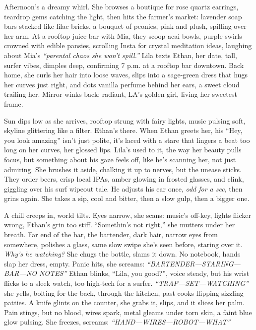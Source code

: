 \documentclass[12pt]{article}
\begin{document}
Afternoon’s a dreamy whirl. She browses a boutique for rose quartz earrings, teardrop gems catching the light, then hits the farmer’s market: lavender soap bars stacked like lilac bricks, a bouquet of peonies, pink and plush, spilling over her arm. At a rooftop juice bar with \textnormal{Mia}, they scoop acai bowls, purple swirls crowned with edible pansies, scrolling Insta for crystal meditation ideas, laughing about \textnormal{Mia}’s \textit{“parental chaos she won’t spill.”} \textnormal{Lila} texts \textnormal{Ethan}, her date, tall, surfer vibes, dimples deep, confirming 7 p.m. at a rooftop bar downtown. Back home, she curls her hair into loose waves, slips into a sage-green dress that hugs her curves just right, and dots vanilla perfume behind her ears, a sweet cloud trailing her. Mirror winks back: radiant, LA’s golden girl, living her sweetest frame.

Sun dips low as she arrives, rooftop strung with fairy lights, music pulsing soft, skyline glittering like a filter. \textnormal{Ethan}’s there. When \textnormal{Ethan} greets her, his “Hey, you look amazing” isn’t just polite, it’s laced with a stare that lingers a beat too long on her curves, her glossed lips. \textnormal{Lila}’s used to it, the way her beauty pulls focus, but something about his gaze feels off, like he’s scanning her, not just admiring. She brushes it aside, chalking it up to nerves, but the unease sticks. They order beers, crisp local IPAs, amber glowing in frosted glasses, and clink, giggling over his surf wipeout tale. He adjusts his ear once, \textit{odd for a sec}, then grins again. She takes a sip, cool and bitter, then a slow gulp, then a bigger one.

A chill creeps in, world tilts. Eyes narrow, she scans: music’s off-key, lights flicker wrong, \textnormal{Ethan}’s grin too stiff. “Somethin’s not right,” she mutters under her breath. Far end of the bar, the bartender, dark hair, narrow eyes from somewhere, polishes a glass, same slow swipe she’s seen before, staring over it. \textit{Why’s he watching?} She chugs the bottle, slams it down. No notebook, hands slap her dress, empty. Panic hits, she screams: \textit{“BARTENDER—STARING—BAR—NO NOTES”} \textnormal{Ethan} blinks, “Lila, you good?”, voice steady, but his wrist flicks to a sleek watch, too high-tech for a surfer. \textit{“TRAP—SET—WATCHING”} she yells, bolting for the back, through the kitchen, past cooks flipping sizzling patties. A knife glints on the counter, she grabs it, slips, and it slices her palm. Pain stings, but no blood, wires spark, metal gleams under torn skin, a faint blue glow pulsing. She freezes, screams: \textit{“HAND—WIRES—ROBOT—WHAT”}
\end{document}
